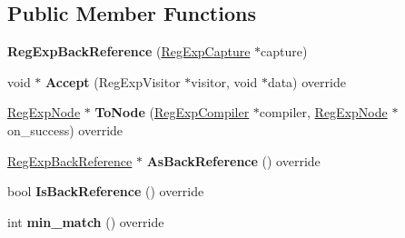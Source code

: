 \subsection*{Public Member Functions}
\begin{DoxyCompactItemize}
\item 
{\bfseries Reg\+Exp\+Back\+Reference} (\hyperlink{classv8_1_1internal_1_1_reg_exp_capture}{Reg\+Exp\+Capture} $\ast$capture)\hypertarget{classv8_1_1internal_1_1_reg_exp_back_reference_a417e270b110639ce5bc1585282383a85}{}\label{classv8_1_1internal_1_1_reg_exp_back_reference_a417e270b110639ce5bc1585282383a85}

\item 
void $\ast$ {\bfseries Accept} (Reg\+Exp\+Visitor $\ast$visitor, void $\ast$data) override\hypertarget{classv8_1_1internal_1_1_reg_exp_back_reference_ab901f3fcc5efcf5c220c87d805db2f46}{}\label{classv8_1_1internal_1_1_reg_exp_back_reference_ab901f3fcc5efcf5c220c87d805db2f46}

\item 
\hyperlink{classv8_1_1internal_1_1_reg_exp_node}{Reg\+Exp\+Node} $\ast$ {\bfseries To\+Node} (\hyperlink{classv8_1_1internal_1_1_reg_exp_compiler}{Reg\+Exp\+Compiler} $\ast$compiler, \hyperlink{classv8_1_1internal_1_1_reg_exp_node}{Reg\+Exp\+Node} $\ast$on\+\_\+success) override\hypertarget{classv8_1_1internal_1_1_reg_exp_back_reference_a073d7a0332ea2d05753f5f66ec0e0da2}{}\label{classv8_1_1internal_1_1_reg_exp_back_reference_a073d7a0332ea2d05753f5f66ec0e0da2}

\item 
\hyperlink{classv8_1_1internal_1_1_reg_exp_back_reference}{Reg\+Exp\+Back\+Reference} $\ast$ {\bfseries As\+Back\+Reference} () override\hypertarget{classv8_1_1internal_1_1_reg_exp_back_reference_ac30d6b7f77f05134d4597dd4b2bb765a}{}\label{classv8_1_1internal_1_1_reg_exp_back_reference_ac30d6b7f77f05134d4597dd4b2bb765a}

\item 
bool {\bfseries Is\+Back\+Reference} () override\hypertarget{classv8_1_1internal_1_1_reg_exp_back_reference_afcef099457f819f81a9284448fe58b0d}{}\label{classv8_1_1internal_1_1_reg_exp_back_reference_afcef099457f819f81a9284448fe58b0d}

\item 
int {\bfseries min\+\_\+match} () override\hypertarget{classv8_1_1internal_1_1_reg_exp_back_reference_a1a346721ea8a72c3c2ce3c237cf477e5}{}\label{classv8_1_1internal_1_1_reg_exp_back_reference_a1a346721ea8a72c3c2ce3c237cf477e5}


\end{DoxyCompactItemize}
